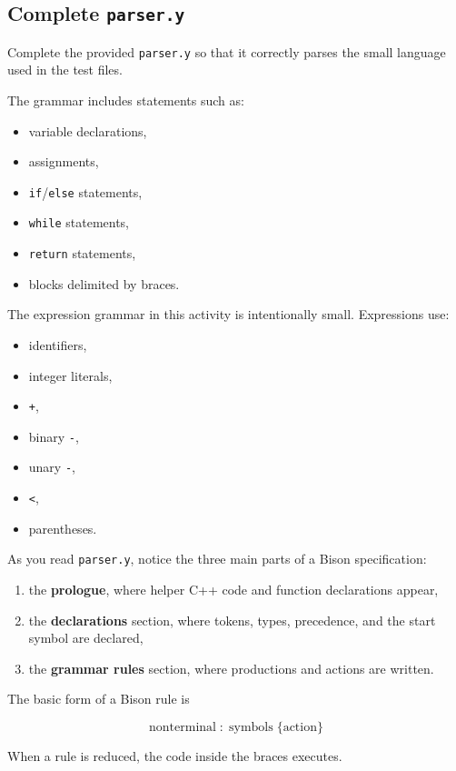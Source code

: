 \documentclass[12pt]{article}
\begin{document}
\subsection*{Complete \texttt{parser.y}}

Complete the provided \texttt{parser.y} so that it correctly parses the small language used in the test files.

The grammar includes statements such as:
\begin{itemize}
    \item variable declarations,
    \item assignments,
    \item \texttt{if}/\texttt{else} statements,
    \item \texttt{while} statements,
    \item \texttt{return} statements,
    \item blocks delimited by braces.
\end{itemize}

The expression grammar in this activity is intentionally small. Expressions use:
\begin{itemize}
    \item identifiers,
    \item integer literals,
    \item \texttt{+},
    \item binary \texttt{-},
    \item unary \texttt{-},
    \item \texttt{<},
    \item parentheses.
\end{itemize}

As you read \texttt{parser.y}, notice the three main parts of a Bison specification:
\begin{enumerate}
    \item the \textbf{prologue}, where helper C++ code and function declarations appear,
    \item the \textbf{declarations} section, where tokens, types, precedence, and the start symbol are declared,
    \item the \textbf{grammar rules} section, where productions and actions are written.
\end{enumerate}

The basic form of a Bison rule is

\[
    \boxed{\text{nonterminal} \; : \; \text{symbols} \; \{ \text{action} \}}
\]

When a rule is reduced, the code inside the braces executes.
\end{document}
